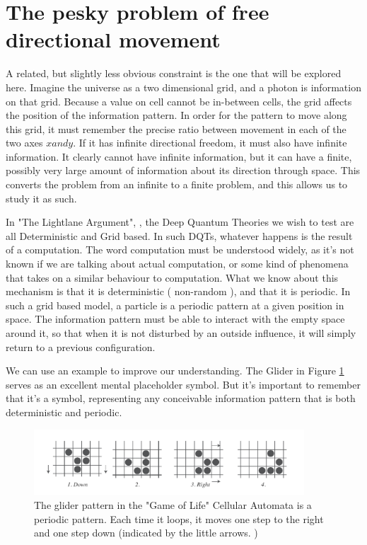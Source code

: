 \documentclass[notitlepage]{article}
\begin{document}
\section{The pesky problem of free directional movement}
A related, but slightly less obvious constraint is the one that will be explored here. Imagine the universe as a two dimensional grid, and a photon is information on that grid. Because a value on cell cannot be  in-between cells, the grid affects the position of the information pattern. In order for the pattern to move along this grid, it must remember the precise ratio between movement in each of the two axes $x and y$. If it has infinite directional freedom, it must also have infinite information. It clearly cannot have infinite information, but it can have a finite, possibly very large amount of information about its direction through space. This converts the problem from an infinite to a finite problem, and this allows us to study it as such.

In "The Lightlane Argument", \cite{RhadamantysA1}, the Deep Quantum Theories we wish to test are all Deterministic and Grid based. In such DQTs, whatever happens is the result of a computation. The word computation must be understood widely, as it's not known if we are talking about actual computation, or some kind of phenomena that takes on a similar behaviour to computation. What we know about this mechanism is that it is deterministic ( non-random ), and that it is periodic. In such a grid based model, a particle is a periodic pattern at a given position in space. The information pattern must be able to interact with the empty space around it, so that when it is not disturbed by an outside influence, it will simply return to a previous configuration.

We can use an example to improve our understanding. The Glider in Figure \ref{fig:glider} serves as an excellent mental placeholder symbol. But it's important to remember that it's a symbol, representing any  conceivable information pattern that is both deterministic and periodic. 

\begin{figure}[!ht]
  \centering

 \includegraphics[width=0.9\textwidth, trim={0cm 0cm 0cm 0cm},clip]{Illustrations/Glider.pdf}
  \caption{The glider pattern in the "Game of Life" Cellular Automata is a periodic pattern. Each time it loops, it moves one step to the right and one step down (indicated by the little arrows.  )  }
      \label{fig:glider}
\end{figure}
\end{document}
